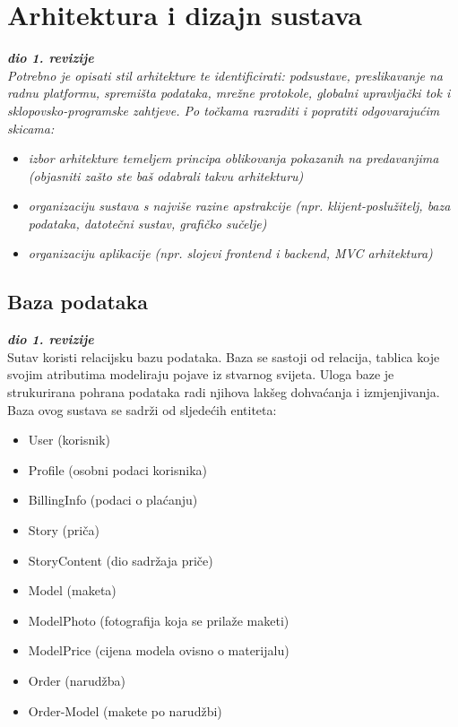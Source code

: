 \chapter{Arhitektura i dizajn sustava}
		
		\textbf{\textit{dio 1. revizije}}\\

		\textit{ Potrebno je opisati stil arhitekture te identificirati: podsustave, preslikavanje na radnu platformu, spremišta podataka, mrežne protokole, globalni upravljački tok i sklopovsko-programske zahtjeve. Po točkama razraditi i popratiti odgovarajućim skicama:}
	\begin{itemize}
		\item 	\textit{izbor arhitekture temeljem principa oblikovanja pokazanih na predavanjima (objasniti zašto ste baš odabrali takvu arhitekturu)}
		\item 	\textit{organizaciju sustava s najviše razine apstrakcije (npr. klijent-poslužitelj, baza podataka, datotečni sustav, grafičko sučelje)}
		\item 	\textit{organizaciju aplikacije (npr. slojevi frontend i backend, MVC arhitektura) }		
	\end{itemize}

	
		

		

				
		\section{Baza podataka}
			
			\textbf{\textit{dio 1. revizije}}\\
			
			\noindent Sutav koristi relacijsku bazu podataka. Baza se sastoji od relacija, tablica koje svojim atributima modeliraju pojave iz stvarnog svijeta. Uloga baze je strukurirana pohrana  podataka radi njihova lakšeg dohvaćanja i izmjenjivanja. Baza ovog sustava se sadrži od sljedećih entiteta:
			\begin{itemize}
				\item User (korisnik)
				\item Profile (osobni podaci korisnika)
				\item BillingInfo (podaci o plaćanju)
				\item Story (priča)
				\item StoryContent (dio sadržaja priče) 
				\item Model (maketa)
				\item ModelPhoto (fotografija koja se prilaže maketi)
				\item ModelPrice (cijena modela ovisno o materijalu)
				\item Order (narudžba)
				\item Order-Model (makete po narudžbi)
			\end{itemize}
		
